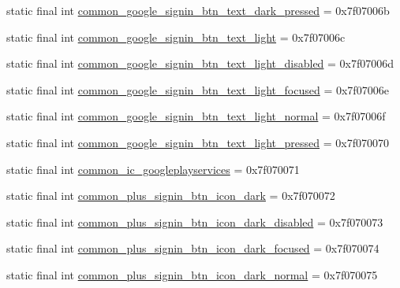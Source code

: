 \begin{DoxyCompactItemize}
static final int \mbox{\hyperlink{classcom_1_1google_1_1android_1_1gms_1_1R_1_1drawable_a1ac1377d33e8f2d7c64cd39a63b5d084}{common\+\_\+google\+\_\+signin\+\_\+btn\+\_\+text\+\_\+dark\+\_\+pressed}} = 0x7f07006b
\item 
static final int \mbox{\hyperlink{classcom_1_1google_1_1android_1_1gms_1_1R_1_1drawable_a16eb3be08ccc166c0f905703103bc64b}{common\+\_\+google\+\_\+signin\+\_\+btn\+\_\+text\+\_\+light}} = 0x7f07006c
\item 
static final int \mbox{\hyperlink{classcom_1_1google_1_1android_1_1gms_1_1R_1_1drawable_a14bf631f05bc2a48681dca1709fc3150}{common\+\_\+google\+\_\+signin\+\_\+btn\+\_\+text\+\_\+light\+\_\+disabled}} = 0x7f07006d
\item 
static final int \mbox{\hyperlink{classcom_1_1google_1_1android_1_1gms_1_1R_1_1drawable_a355ffcdd1bd8c16a760023770fc44b4c}{common\+\_\+google\+\_\+signin\+\_\+btn\+\_\+text\+\_\+light\+\_\+focused}} = 0x7f07006e
\item 
static final int \mbox{\hyperlink{classcom_1_1google_1_1android_1_1gms_1_1R_1_1drawable_a11dd68ca14cad18a325f83c88554d05d}{common\+\_\+google\+\_\+signin\+\_\+btn\+\_\+text\+\_\+light\+\_\+normal}} = 0x7f07006f
\item 
static final int \mbox{\hyperlink{classcom_1_1google_1_1android_1_1gms_1_1R_1_1drawable_a07555ec6ea36e35b34fd806b0c2e05b6}{common\+\_\+google\+\_\+signin\+\_\+btn\+\_\+text\+\_\+light\+\_\+pressed}} = 0x7f070070
\item 
static final int \mbox{\hyperlink{classcom_1_1google_1_1android_1_1gms_1_1R_1_1drawable_add8b6d9f96139355f6f0c7172c7995ba}{common\+\_\+ic\+\_\+googleplayservices}} = 0x7f070071
\item 
static final int \mbox{\hyperlink{classcom_1_1google_1_1android_1_1gms_1_1R_1_1drawable_a829325c28fbb8b2bd2c539333e426ba6}{common\+\_\+plus\+\_\+signin\+\_\+btn\+\_\+icon\+\_\+dark}} = 0x7f070072
\item 
static final int \mbox{\hyperlink{classcom_1_1google_1_1android_1_1gms_1_1R_1_1drawable_adde56c2f0df150ff344d5e2a52333f6e}{common\+\_\+plus\+\_\+signin\+\_\+btn\+\_\+icon\+\_\+dark\+\_\+disabled}} = 0x7f070073
\item 
static final int \mbox{\hyperlink{classcom_1_1google_1_1android_1_1gms_1_1R_1_1drawable_ae7fc2cd96ce36f49f279f78ae9bfa201}{common\+\_\+plus\+\_\+signin\+\_\+btn\+\_\+icon\+\_\+dark\+\_\+focused}} = 0x7f070074
\item 
static final int \mbox{\hyperlink{classcom_1_1google_1_1android_1_1gms_1_1R_1_1drawable_a6f612ac8530f65349eb35f707036c917}{common\+\_\+plus\+\_\+signin\+\_\+btn\+\_\+icon\+\_\+dark\+\_\+normal}} = 0x7f070075

\end{DoxyCompactItemize}
